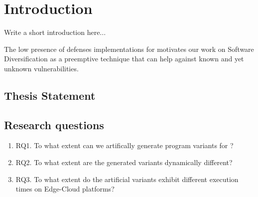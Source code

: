 \chapter{Introduction}


\newcommand{\rqone}{RQ1. To what extent can we artifically generate program variants for \wasm?}

\newcommand{\rqtwo}{RQ2. To what extent are the generated variants dynamically different?}
\newcommand{\rqthree}{RQ3. To what extent do the artificial variants exhibit different execution times on Edge-Cloud platforms?}

Write a short introduction here...


The low presence of defenses implementations for \wasm motivates our work on Software Diversification as a preemptive technique that can help against known and yet unknown vulnerabilities.


\section{Thesis Statement}



\section{Research questions}
\label{intro:definition:rq}


\begin{enumerate}
    \item \rqone

    \item \rqtwo
    
    \item \rqthree
    
\end{enumerate}


